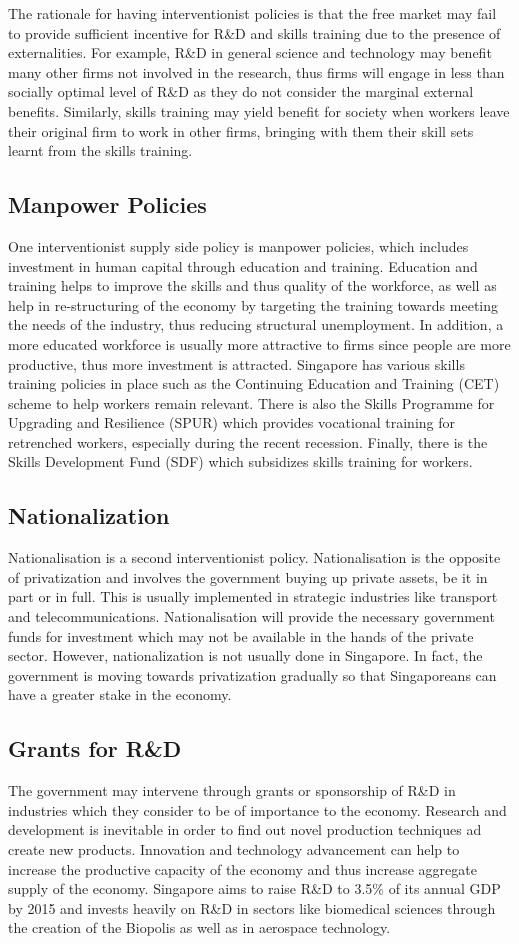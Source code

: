 The rationale for having interventionist policies is that the free market may fail to provide sufficient incentive for R\&D and skills training due to the presence of externalities. For example, R\&D in general science and technology may benefit many other firms not involved in the research, thus firms will engage in less than socially optimal level of R\&D as they do not consider the marginal external benefits. Similarly, skills training may yield benefit for society when workers leave their original firm to work in other firms, bringing with them their skill sets learnt from the skills training.
\subsection{Manpower Policies}
One interventionist supply side policy is manpower policies, which includes investment in human capital through education and training. Education and training helps to improve the skills and thus quality of the workforce, as well as help in re-structuring of the economy by targeting the training towards meeting the needs of the industry, thus reducing structural unemployment. In addition, a more educated workforce is usually more attractive to firms since people are more productive, thus more investment is attracted. Singapore has various skills training policies in place such as the Continuing Education and Training (CET) scheme to help workers remain relevant. There is also the Skills Programme for Upgrading and Resilience (SPUR) which provides vocational training for retrenched workers, especially during the recent recession. Finally, there is the Skills Development Fund (SDF) which subsidizes skills training for workers.
\subsection{Nationalization}
Nationalisation is a second interventionist policy. Nationalisation is the opposite of privatization and involves the government buying up private assets, be it in part or in full. This is usually implemented in strategic industries like transport and telecommunications. Nationalisation will provide the necessary government funds for investment which may not be available in the hands of the private sector. However, nationalization is not usually done in Singapore. In fact, the government is moving towards privatization gradually so that Singaporeans can have a greater stake in the economy.
\subsection{Grants for R\&D}
The government may intervene through grants or sponsorship of R\&D in industries which they consider to be of importance to the economy. Research and development is inevitable in order to find out novel production techniques ad create new products. Innovation and technology advancement can help to increase the productive capacity of the economy and thus increase aggregate supply of the economy. Singapore aims to raise R\&D to 3.5\% of its annual GDP by 2015 and invests heavily on R\&D in sectors like biomedical sciences through the creation of the Biopolis as well as in aerospace technology.
